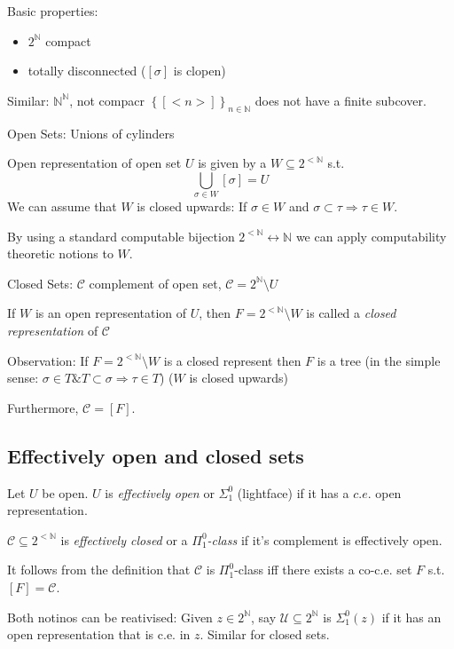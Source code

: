 \documentclass[12pt]{article}
\newcommand{\Nat}{\ensuremath{\mathbb{N}}}
\begin{document}
Basic properties:
\begin{itemize}
  \item $2^\Nat$ compact
  \item totally disconnected ($[\sigma]$ is clopen)
\end{itemize}

Similar: $\Nat^\Nat$, not compacr
$\left\{ [<n>] \right\}_{n \in \Nat}$ %
does not have a finite subcover.

Open Sets: Unions of cylinders

Open representation of open set $U$ is given by a $W \subseteq 2^{<\Nat}$
s.t.
\[
\bigcup_{\sigma \in W} [\sigma] = U
\]
We can assume that $W$ is closed upwards:
If $\sigma \in W$ and $\sigma \subset \tau \Rightarrow \tau \in W$.

By using a standard computable bijection $2^{<\Nat} \leftrightarrow \Nat$
we can apply computability theoretic notions to $W$.

Closed Sets:
$\mathcal{C}$ complement of open set, $\mathcal{C} = 2^\Nat \setminus U$

If $W$ is an open representation of $U$,
then $F = 2^{<\Nat} \setminus W$ is called a \emph{closed representation}
of $\mathcal{C}$

Observation:
If $F = 2^{<\Nat} \setminus W$ is a closed represent then $F$ is a tree
(in the simple sense: $\sigma \in T \& T \subset \sigma \Rightarrow \tau \in T$)
($W$ is closed upwards)

Furthermore, $\mathcal{C} = [F]$.

\subsection{Effectively open and closed sets}

Let $U$ be open.  $U$ is \emph{effectively open} or
\emph{$\Sigma^0_1$} (lightface) if it has a $c.e.$ open representation.

$\mathcal{C} \subseteq 2^{<\Nat}$ is \emph{effectively closed} or
a \emph{$\Pi^0_1$-class} if it's complement is effectively open.

It follows from the definition that $\mathcal{C}$ is $\Pi^0_1$-class
iff there exists a co-c.e. set $F$ s.t. $[F] = \mathcal{C}$.

Both notinos can be reativised:
%
Given $z \in 2^\Nat$, say $\mathcal{U} \subseteq 2^\Nat$ is $\Sigma^0_1(z)$
if it has an open representation that is c.e. in $z$.
%
Similar for closed sets.
\end{document}
